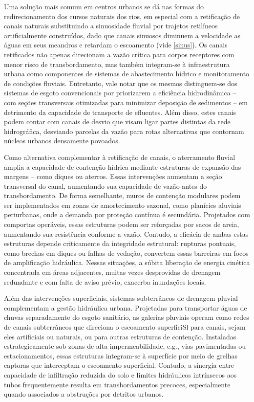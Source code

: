Uma solução mais comum em centros urbanos se dá nas formas do redirecionamento dos cursos naturais dos rios, em especial
com a retificação de canais naturais substituindo a sinuosidade fluvial por trajetos retilíneos artificialmente
construídos, dado que canais sinuosos diminuem a velocidade as águas em seus meandros e retardam o escoamento (vide
\autoref{sinus}). Os canais retificados não apenas direcionam a vazão crítica para corpos receptores com menor risco de
transbordamento, mas também integram-se à infraestrutura urbana como componentes de sistemas de abastecimento hídrico e
monitoramento de condições fluviais. Entretanto, vale notar que os mesmos distinguem-se dos sistemas de esgoto
convencionais por priorizarem a eficiência hidrodinâmica – com seções transversais otimizadas para minimizar deposição
de sedimentos – em detrimento da capacidade de transporte de efluentes. Além disso, estes canais podem contar com canais
de desvio que visam ligar partes distintas da rede hidrográfica, desviando parcelas da vazão para rotas alternativas que
contornam núcleos urbanos densamente povoados.

Como alternativa complementar à retificação de canais, o aterramento fluvial amplia a capacidade de contenção hídrica
mediante estruturas de expansão das margens – como diques ou aterros. Essas intervenções aumentam a seção transversal do
canal, aumentando sua capacidade de vazão antes do transbordamento. De forma semelhante, muros de contenção modulares
podem ser implementados em zonas de amortecimento sazonal, como planícies aluviais periurbanas, onde a demanda por
proteção contínua é secundária. Projetados com comportas operáveis, essas estruturas podem ser reforçadas por sacos de
areia, aumentando sua resistência conforme a vazão. Contudo, a eficácia de ambas estas estruturas depende criticamente
da integridade estrutural: rupturas pontuais, como brechas em diques ou falhas de vedação, convertem essas barreiras em
focos de amplificação hidráulica. Nessas situações, a súbita liberação de energia cinética concentrada em áreas
adjacentes, muitas vezes desprovidas de drenagem redundante e com falta de aviso prévio, exacerba inundações locais.

Além das intervenções superficiais, sistemas subterrâneos de drenagem pluvial complementam a gestão hidráulica urbana.
Projetadas para transportar águas de chuvas separadamente do esgoto sanitário, as galerias pluviais operam como redes de
canais subterrâneos que direciona o escoamento superficiSl para canais, sejam eles artificiais ou naturais, ou para
outras estruturas de contenção. Instaladas estrategicamente sob zonas de alta impermeabilidade, e.g., vias pavimentadas
ou estacionamentos, essas estruturas integram-se à superfície por meio de grelhas captoras que interceptam o escoamento
superficial. Contudo, a sinergia entre capacidade de infiltração reduzida do solo e limites hidráulicos intrínsecos aos
tubos frequentemente resulta em transbordamentos precoces, especialmente quando associados a obstruções por detritos
urbanos.

